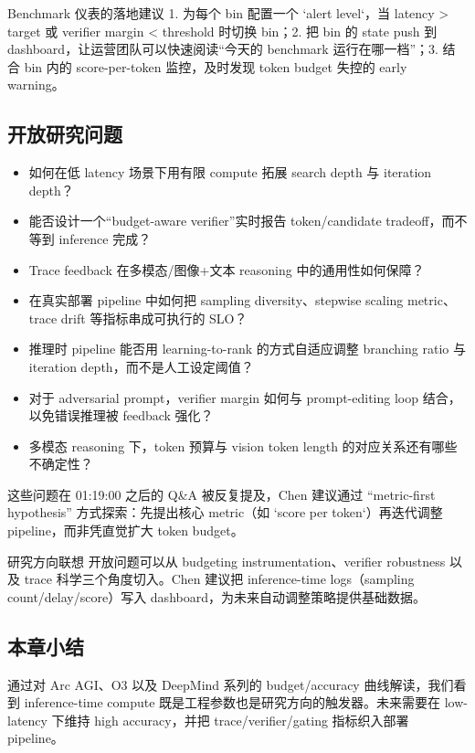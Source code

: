 \begin{importantbox}{Benchmark 仪表的落地建议}
1. 为每个 bin 配置一个 `alert level`，当 latency > target 或 verifier margin < threshold 时切换 bin；2. 把 bin 的 state push 到 dashboard，让运营团队可以快速阅读“今天的 benchmark 运行在哪一档”；3. 结合 bin 内的 score-per-token 监控，及时发现 token budget 失控的 early warning。
\end{importantbox}

\subsection{开放研究问题}
\begin{itemize}
\item 如何在低 latency 场景下用有限 compute 拓展 search depth 与 iteration depth？
\item 能否设计一个“budget-aware verifier”实时报告 token/candidate tradeoff，而不等到 inference 完成？
\item Trace feedback 在多模态/图像+文本 reasoning 中的通用性如何保障？
\item 在真实部署 pipeline 中如何把 sampling diversity、stepwise scaling metric、trace drift 等指标串成可执行的 SLO？
\end{itemize}

\begin{itemize}
\item 推理时 pipeline 能否用 learning-to-rank 的方式自适应调整 branching ratio 与 iteration depth，而不是人工设定阈值？
\item 对于 adversarial prompt，verifier margin 如何与 prompt-editing loop 结合，以免错误推理被 feedback 强化？
\item 多模态 reasoning 下，token 预算与 vision token length 的对应关系还有哪些不确定性？
\end{itemize}

这些问题在 01:19:00 之后的 Q\&A 被反复提及，Chen 建议通过 “metric-first hypothesis” 方式探索：先提出核心 metric（如 `score per token`）再迭代调整 pipeline，而非凭直觉扩大 token budget。

\begin{knowledgebox}{研究方向联想}
开放问题可以从 budgeting instrumentation、verifier robustness 以及 trace 科学三个角度切入。Chen 建议把 inference-time logs（sampling count/delay/score）写入 dashboard，为未来自动调整策略提供基础数据。
\end{knowledgebox}

\subsection{本章小结}
通过对 Arc AGI、O3 以及 DeepMind 系列的 budget/accuracy 曲线解读，我们看到 inference-time compute 既是工程参数也是研究方向的触发器。未来需要在 low-latency 下维持 high accuracy，并把 trace/verifier/gating 指标织入部署 pipeline。

